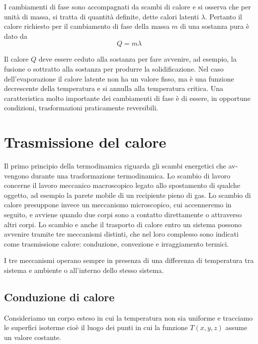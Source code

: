 \documentclass[class=book, crop=false, oneside, 12pt]{standalone}
\begin{document}
I cambiamenti di fase sono accompagnati da scambi di calore e si osserva che per unità di massa, si tratta di quantità definite, dette calori latenti \(\lambda\). 
Pertanto il calore richiesto per il cambiamento di fase della massa \(m\) di una sostanza pura è dato da
\begin{equation}
    Q = m \lambda
\end{equation}

Il calore \(Q\) deve essere ceduto alla sostanza per fare avvenire, ad esempio, la fusione o sottratto alla sostanza per produrre la solidificazione.\newline
Nel caso dell'evaporazione il calore latente non ha un valore fisso, ma è una funzione decrescente della temperatura e si annulla alla temperatura critica.\newline
Una caratteristica molto importante dei cambiamenti di fase è di essere, in opportune condizioni, trasformazioni praticamente reversibili.

\section{Trasmissione del calore}

Il primo principio della termodinamica riguarda gli scambi energetici che av-vengono durante una trasformazione termodinamica. Lo scambio di lavoro concerne il lavoro meccanico macroscopico legato allo spostamento di qualche oggetto, ad esempio la parete mobile di un recipiente pieno di gas. 
Lo scambio di calore presuppone invece un meccanismo microscopico, cui accenneremo in seguito, e avviene quando due corpi sono a contatto direttamente o attraverso altri corpi.
Lo scambio e anche il trasporto di calore entro un sistema possono avvenire tramite tre meccanismi distinti, che nel loro complesso sono indicati come trasmissione calore: conduzione, convezione e irraggiamento termici.

I tre meccanismi operano sempre in presenza di una differenza di temperatura tra sistema e ambiente o all'interno dello stesso sistema. 

\subsection{Conduzione di calore}

Consideriamo un corpo esteso in cui la temperatura non sia uniforme e tracciamo le superfici isoterme cioè il luogo dei punti in cui la funzione \(T(x,y,z)\) assume un valore costante.
\end{document}
